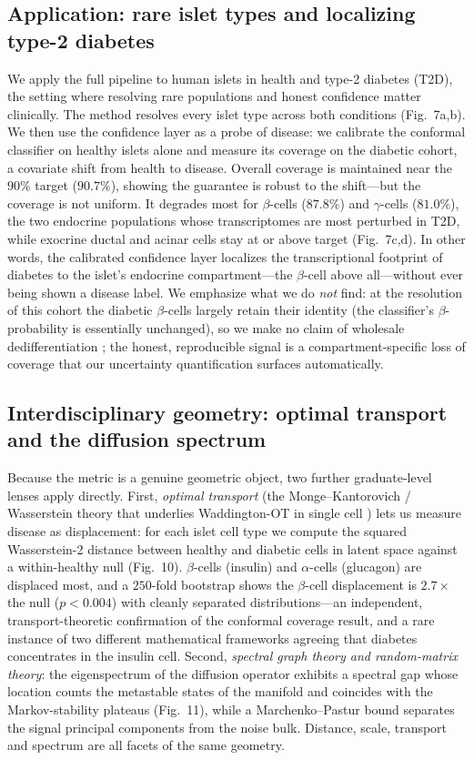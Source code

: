 \documentclass[11pt]{article}
\begin{document}
\subsection{Application: rare islet types and localizing type-2 diabetes}
We apply the full pipeline to human islets in health and type-2 diabetes (T2D), the setting where
resolving rare populations and honest confidence matter clinically. The method resolves every islet
type across both conditions (Fig.~7a,b). We then use the confidence layer as a probe of disease: we
calibrate the conformal classifier on healthy islets alone and measure its coverage on the diabetic
cohort, a covariate shift from health to disease. Overall coverage is maintained near the $90\%$
target ($90.7\%$), showing the guarantee is robust to the shift---but the coverage is not uniform.
It degrades most for $\beta$-cells ($87.8\%$) and $\gamma$-cells ($81.0\%$), the two endocrine
populations whose transcriptomes are most perturbed in T2D, while exocrine ductal and acinar cells
stay at or above target (Fig.~7c,d). In other words, the calibrated confidence layer localizes the
transcriptional footprint of diabetes to the islet's endocrine compartment---the $\beta$-cell above
all---without ever being shown a disease label. We emphasize what we do \emph{not} find: at the
resolution of this cohort the diabetic $\beta$-cells largely retain their identity (the classifier's
$\beta$-probability is essentially unchanged), so we make no claim of wholesale dedifferentiation
\citep{talchai2012dedifferentiation,weng2023hnf1a}; the honest, reproducible signal is a
compartment-specific loss of coverage that our uncertainty quantification surfaces automatically.

\subsection{Interdisciplinary geometry: optimal transport and the diffusion spectrum}
Because the metric is a genuine geometric object, two further graduate-level lenses apply directly.
First, \emph{optimal transport} (the Monge--Kantorovich / Wasserstein theory that underlies
Waddington-OT in single cell \citep{schiebinger2019}) lets us measure disease as displacement: for
each islet cell type we compute the squared Wasserstein-2 distance between healthy and diabetic cells
in latent space against a within-healthy null (Fig.~10). $\beta$-cells (insulin) and $\alpha$-cells
(glucagon) are displaced most, and a $250$-fold bootstrap shows the $\beta$-cell displacement is
$2.7\times$ the null ($p<0.004$) with cleanly separated distributions---an independent,
transport-theoretic confirmation of the conformal coverage result, and a rare instance of two
different mathematical frameworks agreeing that diabetes concentrates in the insulin cell. Second,
\emph{spectral graph theory and random-matrix theory}: the eigenspectrum of the diffusion operator
exhibits a spectral gap whose location counts the metastable states of the manifold and coincides with
the Markov-stability plateaus (Fig.~11), while a Marchenko--Pastur bound separates the signal principal
components from the noise bulk. Distance, scale, transport and spectrum are all facets of the same
geometry.
\end{document}
